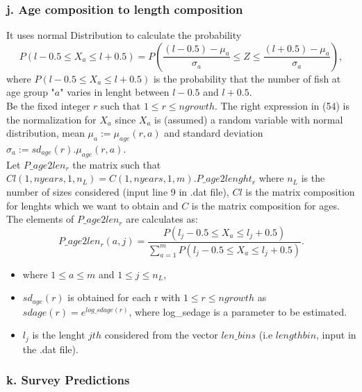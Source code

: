 \documentclass{article}
\begin{document}
\hfill

\subsubsection{j. Age composition to length composition}

It uses normal Distribution to calculate the probability 
\begin{equation}
    P(l-0.5\leq X_a\leq l+0.5 ) = P\left(\dfrac{(l-0.5)-\mu_a}{\sigma_a}\leq Z\leq\dfrac{(l+0.5)-\mu_a}{\sigma_a}\right),
\end{equation}
where $P(l-0.5\leq X_a\leq l+0.5 )$ is the probability that the number of fish at age group "$a$" varies in lenght between  $l-0.5$ and $l+0.5$.\\Be the fixed integer $r$ such that $1\leq r \leq ngrowth$.
The right expression in (54) is the normalization for $X_a$ since $X_a$ is (assumed) a random variable with normal distribution, mean $\mu_a:=\mu_{age}(r,a)$ and  standard deviation $\sigma_{a}:=sd_{age}(r).\mu_{age}(r,a)$.\\

Let $P\_age2len_r$ the matrix such that $Cl(1,nyears,1,n_L)=C(1,nyears,1,m).P\_age2lenght_r$ where $n_L$ is the number of sizes considered (input line 9 in .dat file), $Cl$ is the matrix composition for lenghts which we want to obtain and $C$ is the matrix composition for ages. The elements of $P\_age2len_r$ are calculates as:
\begin{equation}
    P\_age2len_r(a,j) = \dfrac{P(l_j-0.5\leq X_a\leq l_j+0.5 )}{\displaystyle\sum_{a=1}^mP(l_j-0.5\leq X_a\leq l_j+0.5 )}.
\end{equation}

\begin{itemize}
    \item where $1\leq a \leq m$ and $1\leq j \leq n_L$,
    \item $sd_{age}(r)$ is obtained  for each r with $1\leq r\leq ngrowth$ as $sdage(r)   = e^{log\_sdage(r)}$, where log\_sedage is a parameter to be estimated.
    \item $l_j$ is the lenght $jth$ considered from the vector $len\_bins$ (i.e $lengthbin$, input %
    in the .dat file).
\end{itemize}

\subsubsection{k. Survey Predictions}
\end{document}
